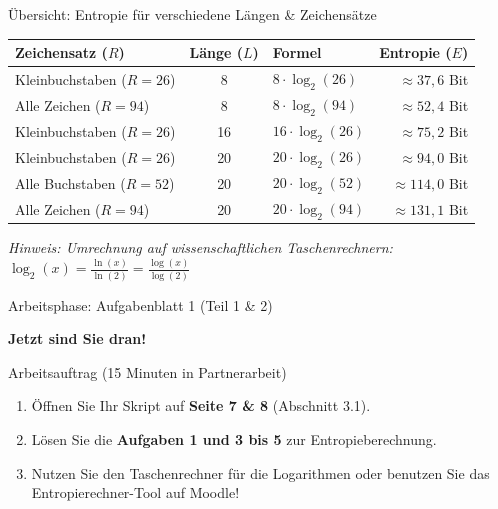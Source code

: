 \documentclass[10pt, aspectratio=169]{beamer}
\begin{document}
\begin{frame}{Übersicht: Entropie für verschiedene Längen \& Zeichensätze}
  \centering
  \small
  \pause
  \begin{tabular}{l c l r}
    \toprule
    \textbf{Zeichensatz ($R$)} & \textbf{Länge ($L$)} & \textbf{Formel} & \textbf{Entropie ($E$)} \\
    \midrule
    Kleinbuchstaben ($R=26$) & 8 & $8 \cdot \log_2(26)$ & $\approx 37{,}6$ Bit \\
    Alle Zeichen ($R=94$) & 8 & $8 \cdot \log_2(94)$ & $\approx 52{,}4$ Bit \\
    Kleinbuchstaben ($R=26$) & 16 & $16 \cdot \log_2(26)$ & $\approx 75{,}2$ Bit \\
    Kleinbuchstaben ($R=26$) & 20 & $20 \cdot \log_2(26)$ & $\approx 94{,}0$ Bit \\
    Alle Buchstaben ($R=52$) & 20 & $20 \cdot \log_2(52)$ & $\approx 114{,}0$ Bit \\
    Alle Zeichen ($R=94$) & 20 & $20 \cdot \log_2(94)$ & $\approx 131{,}1$ Bit \\
    \bottomrule
  \end{tabular}

  \pause
  \vspace{1em}
  \textit{Hinweis: Umrechnung auf wissenschaftlichen Taschenrechnern: $\log_2(x) = \frac{\ln(x)}{\ln(2)} = \frac{\log(x)}{\log(2)}$}
\end{frame}

\begin{frame}{Arbeitsphase: Aufgabenblatt 1 (Teil 1 \& 2)}
  \pause
  \begin{center}
    \Large \textbf{Jetzt sind Sie dran!}
  \end{center}

  \pause
  \vspace{1em}
  \begin{block}{Arbeitsauftrag (15 Minuten in Partnerarbeit)}
    \begin{enumerate}
      \pause
      \item Öffnen Sie Ihr Skript auf \textbf{Seite 7 \& 8} (Abschnitt 3.1).
      \pause
      \item Lösen Sie die \textbf{Aufgaben 1 und 3 bis 5} zur Entropieberechnung.
      \pause
      \item Nutzen Sie den Taschenrechner für die Logarithmen oder benutzen Sie das Entropierechner-Tool auf Moodle!
    \end{enumerate}
  \end{block}
\end{frame}
\end{document}

